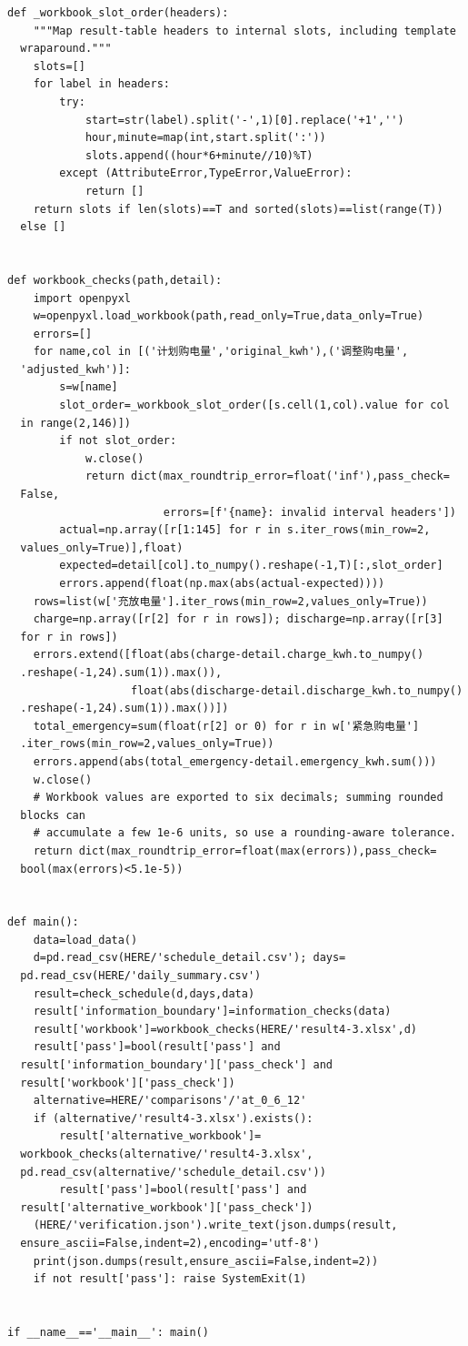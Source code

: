 \begin{verbatim}
def _workbook_slot_order(headers):
    """Map result-table headers to internal slots, including template
  wraparound."""
    slots=[]
    for label in headers:
        try:
            start=str(label).split('-',1)[0].replace('+1','')
            hour,minute=map(int,start.split(':'))
            slots.append((hour*6+minute//10)%T)
        except (AttributeError,TypeError,ValueError):
            return []
    return slots if len(slots)==T and sorted(slots)==list(range(T))
  else []


def workbook_checks(path,detail):
    import openpyxl
    w=openpyxl.load_workbook(path,read_only=True,data_only=True)
    errors=[]
    for name,col in [('计划购电量','original_kwh'),('调整购电量',
  'adjusted_kwh')]:
        s=w[name]
        slot_order=_workbook_slot_order([s.cell(1,col).value for col
  in range(2,146)])
        if not slot_order:
            w.close()
            return dict(max_roundtrip_error=float('inf'),pass_check=
  False,
                        errors=[f'{name}: invalid interval headers'])
        actual=np.array([r[1:145] for r in s.iter_rows(min_row=2,
  values_only=True)],float)
        expected=detail[col].to_numpy().reshape(-1,T)[:,slot_order]
        errors.append(float(np.max(abs(actual-expected))))
    rows=list(w['充放电量'].iter_rows(min_row=2,values_only=True))
    charge=np.array([r[2] for r in rows]); discharge=np.array([r[3]
  for r in rows])
    errors.extend([float(abs(charge-detail.charge_kwh.to_numpy()
  .reshape(-1,24).sum(1)).max()),
                   float(abs(discharge-detail.discharge_kwh.to_numpy()
  .reshape(-1,24).sum(1)).max())])
    total_emergency=sum(float(r[2] or 0) for r in w['紧急购电量']
  .iter_rows(min_row=2,values_only=True))
    errors.append(abs(total_emergency-detail.emergency_kwh.sum()))
    w.close()
    # Workbook values are exported to six decimals; summing rounded
  blocks can
    # accumulate a few 1e-6 units, so use a rounding-aware tolerance.
    return dict(max_roundtrip_error=float(max(errors)),pass_check=
  bool(max(errors)<5.1e-5))


def main():
    data=load_data()
    d=pd.read_csv(HERE/'schedule_detail.csv'); days=
  pd.read_csv(HERE/'daily_summary.csv')
    result=check_schedule(d,days,data)
    result['information_boundary']=information_checks(data)
    result['workbook']=workbook_checks(HERE/'result4-3.xlsx',d)
    result['pass']=bool(result['pass'] and
  result['information_boundary']['pass_check'] and
  result['workbook']['pass_check'])
    alternative=HERE/'comparisons'/'at_0_6_12'
    if (alternative/'result4-3.xlsx').exists():
        result['alternative_workbook']=
  workbook_checks(alternative/'result4-3.xlsx',
  pd.read_csv(alternative/'schedule_detail.csv'))
        result['pass']=bool(result['pass'] and
  result['alternative_workbook']['pass_check'])
    (HERE/'verification.json').write_text(json.dumps(result,
  ensure_ascii=False,indent=2),encoding='utf-8')
    print(json.dumps(result,ensure_ascii=False,indent=2))
    if not result['pass']: raise SystemExit(1)


if __name__=='__main__': main()
\end{verbatim}

